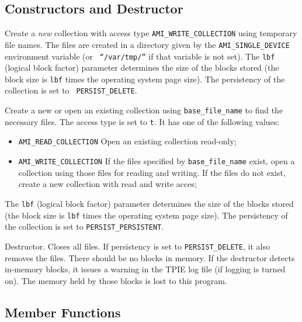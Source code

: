 \subsection{Constructors and Destructor}

   \btabb
	
	 {Create a {\em new}
	collection with access type {\tt AMI\_WRITE\_COLLECTION} using
	temporary file names. The files are created in a directory given by
	the {\tt AMI\_SINGLE\_DEVICE} environment variable (or {\tt
	``/var/tmp/''} if that variable is not set).  The {\tt lbf}
	(logical block factor) parameter determines the size of the blocks
	stored (the block size is {\tt lbf} times the operating system
	page size). The persistency of the collection is set to {\tt
	PERSIST\_DELETE}.}

	 {Create a new or open an 
	existing collection using {\tt base\_file\_name} to find the
	necessary files. The access type is set to {\tt t}. It has one of
	the following values:
	\begin{itemize} 
          \item[]{\tt AMI\_READ\_COLLECTION} Open an existing collection
          read-only;
          \item[]{\tt AMI\_WRITE\_COLLECTION} If the files specified by
          {\tt base\_file\_name} exist, open a collection using those files
          for reading and writing. If the files do not exist, create a new
          collection with read and write acces;
	\end{itemize}
        The {\tt lbf} (logical block factor) parameter determines the size
        of the blocks stored (the block size is {\tt lbf} times the
        operating system page size). The persistency of the collection is
        set to {\tt PERSIST\_PERSISTENT}.}

       {Destructor.
      Closes all files. If persistency is set to {\tt PERSIST\_DELETE}, it
      also removes the files. There should be no blocks in memory. If the
      destructor detects in-memory blocks, it issues a warning in the TPIE
      log file (if logging is turned on). The memory held by those blocks
      is lost to this program.}

   \etabb

\subsection{Member Functions}

